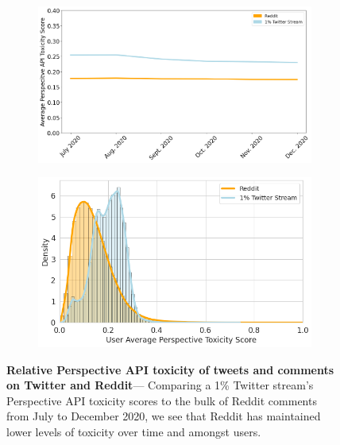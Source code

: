 \begin{figure}
\begin{subfigure}{.48\textwidth}
  \centering
  \includegraphics[width=1\linewidth]{figures/average-toxicity-end-2020.png}
\label{fig:cdf-subreddit-hyperlinks}
\end{subfigure}%
\begin{subfigure}{.48\textwidth}
  \centering
  \includegraphics[width=1\linewidth]{figures/average-toxicity-distribution-end2020.png}
 \label{fig:cdf-user-hyperlinks}
\end{subfigure}
\label{fig:cdf-hyperlinsk}
\caption{\textbf{Relative Perspective API toxicity of tweets and comments on Twitter and Reddit}--- Comparing a 1\% Twitter stream's Perspective API toxicity scores to the bulk of Reddit comments from  July to December 2020, we see that Reddit has maintained lower levels of toxicity over time and amongst users. }
\end{figure}


